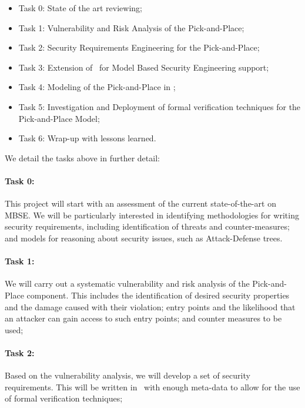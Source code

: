 \begin{itemize}
  \item Task 0: State of the art reviewing;
  \item Task 1: Vulnerability and Risk Analysis of the Pick-and-Place;  
  \item Task 2: Security Requirements Engineering for the Pick-and-Place; 
  \item Task 3: Extension of \autofocus\ for Model Based Security Engineering support;
  \item Task 4: Modeling of the Pick-and-Place in \autofocus;
  \item Task 5: Investigation and Deployment of formal verification techniques for the Pick-and-Place Model;
  \item Task 6: Wrap-up with lessons learned.
\end{itemize}

We detail the tasks above in further detail:

\paragraph{Task 0:} This project will start with an assessment of the current state-of-the-art on MBSE. We will be particularly interested in identifying methodologies for writing security requirements, including identification of threats and counter-measures; and models for reasoning about security issues, such as Attack-Defense trees. 

\paragraph{Task 1:} We will carry out a systematic vulnerability and risk analysis of the Pick-and-Place component. This includes the identification of desired security properties and the damage caused with their violation; entry points and the likelihood that an attacker can gain access to such entry points; and counter measures to be used;

\paragraph{Task 2:} Based on the vulnerability analysis, we will develop a set of security requirements. This will be written in \autofocus\ with enough meta-data to allow for the use of formal verification techniques;


